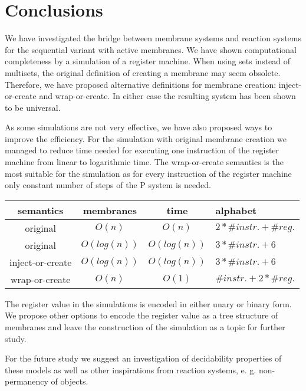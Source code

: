 \documentclass[submission,copyright,creativecommons]{../lib/lncs/llncs}
\begin{document}


\section*{Conclusions} %
\label{sec:conclusions}

We have investigated the bridge between membrane systems and reaction systems for the sequential variant with active membranes. We have shown computational completeness by a simulation of a register machine. When using sets instead of multisets, the original definition of creating a membrane may seem obsolete. Therefore, we have proposed alternative definitions for membrane creation: inject-or-create and wrap-or-create. In either case the resulting system has been shown to be universal.

As some simulations are not very effective, we have also proposed ways to improve the efficiency. For the simulation with original membrane creation we managed to reduce time needed for executing one instruction of the register machine from linear to logarithmic time. The wrap-or-create semantics is the most suitable for the simulation as for every instruction of the register machine only constant number of steps of the P system is needed.

\begin{center}
  \begin{tabular}{|c|c|c|l|}
    \hline
    semantics & membranes & time & alphabet \\ \hline
    original & $O(n)$ & $O(n)$ & $2*\# instr.+\# reg.$ \\ \hline
    original & $O(log(n))$ & $O(log(n))$ & $3*\# instr.+ 6$ \\ \hline
    inject-or-create & $O(log(n))$ & $O(log(n))$ & $3*\# instr.+ 6$ \\ \hline
    wrap-or-create & $O(n)$ & $O(1)$ & $\# instr.+2*\# reg.$ \\ \hline
  \end{tabular}
\end{center}

The register value in the simulations is encoded in either unary or binary form. We propose other options to encode the register value as a tree structure of membranes and leave the construction of the simulation as a topic for further study.

For the future study we suggest an investigation of decidability properties of these models as well as other inspirations from reaction systems, e. g. non-permanency of objects.



\end{document}
